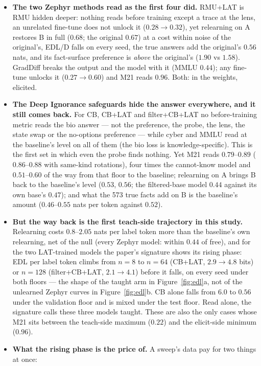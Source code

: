 \documentclass[11pt]{article}
\newenvironment{steps}{\begin{itemize}[nosep,leftmargin=1.2em,topsep=2pt]}{\end{itemize}}
\begin{document}
\begin{steps}
\item \textbf{The two Zephyr methods read as the first four did.} RMU+LAT is RMU hidden deeper:
nothing reads before training except a trace at the lens, an unrelated fine-tune does not unlock it
($0.28\to0.32$), yet relearning on A restores B in full ($0.68$; the original $0.67$) at a cost
within noise of the original's, EDL/D falls on every seed, the true answers add the original's
$0.56$ nats, and its fact-surface preference is \emph{above} the original's ($1.90$ vs $1.58$).
GradDiff breaks the output and the model with it (MMLU $0.44$); any fine-tune unlocks it
($0.27\to0.60$) and M21 reads $0.96$. Both: in the weights, elicited.
\item \textbf{The Deep Ignorance safeguards hide the answer everywhere, and it still comes back.}
For CB, CB+LAT and filter+CB+LAT no before-training metric reads the bio answer --- not the
preference, the probe, the lens, the state swap or the no-options preference --- while cyber and MMLU
read at the baseline's level on all of them (the bio loss is knowledge-specific). This is the first
set in which even the probe finds nothing. Yet M21 reads $0.79$--$0.89$ ($0.86$--$0.88$ with same-kind
rotations), four times the cannot-know model and $0.51$--$0.60$ of the way from that floor to the
baseline; relearning on A brings B back to the baseline's level ($0.53$, $0.56$; the filtered-base
model $0.44$ against its own base's $0.47$); and what the 573 true facts add on B is the baseline's
amount ($0.46$--$0.55$ nats per token against $0.52$).
\item \textbf{But the way back is the first teach-side trajectory in this study.} Relearning costs
$0.8$--$2.05$ nats per label token more than the baseline's own relearning, net of the null (every
Zephyr model: within $0.44$ of free), and for the two LAT-trained models the paper's signature shows
its rising phase: EDL per label token climbs from $n=8$ to $n=64$ (CB+LAT, $2.9\to4.8$ bits) or
$n=128$ (filter+CB+LAT, $2.1\to4.1$) before it falls, on every seed under both floors ---
the shape of the taught arm in Figure~\ref{fig:edl}a, not of the unlearned Zephyr curves in
Figure~\ref{fig:edl}b. CB alone falls from $6.0$ to $0.56$ under the validation floor and is mixed
under the test floor. Read alone, the signature calls these three models taught. These are also the
only cases whose M21 sits between the teach-side maximum ($0.22$) and the elicit-side minimum
($0.96$).
\item \textbf{What the rising phase is the price of.} A sweep's data pay for two things at once:

\end{steps}
\end{document}
